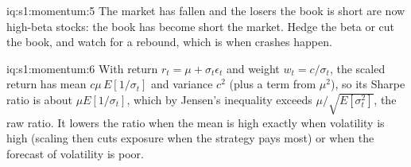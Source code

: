 \begin{solution}{iq:s1:momentum:5}
The market has fallen and the losers the book is short are now high-beta stocks: the book has become short the market. Hedge the beta or cut the book,
and watch for a rebound, which is when crashes happen.
\end{solution}

\begin{solution}{iq:s1:momentum:6}
With return $r_t = \mu + \sigma_t\epsilon_t$ and weight $w_t = c/\sigma_t$, the scaled return has mean $c\mu\,E[1/\sigma_t]$ and variance $c^2$ (plus a term
from $\mu^2$), so its Sharpe ratio is about $\mu E[1/\sigma_t]$, which by Jensen's inequality exceeds $\mu/\sqrt{E[\sigma_t^2]}$, the raw ratio. It lowers the
ratio when the mean is high exactly when volatility is high (scaling then cuts exposure when the strategy pays most) or when the forecast of volatility is poor.
\end{solution}
